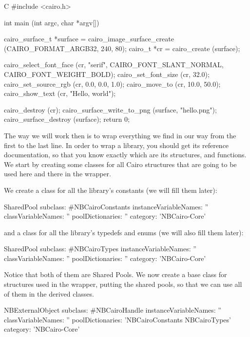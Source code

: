 \documentclass[a4paper,10pt,twoside]{book}
\begin{document}
\begin{code}{C}
#include <cairo.h>

int
main (int argc, char *argv[])
{
        cairo_surface_t *surface =
            cairo_image_surface_create (CAIRO_FORMAT_ARGB32, 240, 80);
        cairo_t *cr =
            cairo_create (surface);

        cairo_select_font_face (cr, "serif", CAIRO_FONT_SLANT_NORMAL, CAIRO_FONT_WEIGHT_BOLD);
        cairo_set_font_size (cr, 32.0);
        cairo_set_source_rgb (cr, 0.0, 0.0, 1.0);
        cairo_move_to (cr, 10.0, 50.0);
        cairo_show_text (cr, "Hello, world");

        cairo_destroy (cr);
        cairo_surface_write_to_png (surface, "hello.png");
        cairo_surface_destroy (surface);
        return 0;
}
\end{code}

The way we will work then is to wrap everything we find in
our way from the first to the last line. In order to wrap a
library, you should get its reference documentation, so that
you know exactly which are its structures, and functions.
We start by creating some classes for all Cairo structures
that are going to be used here and there in the wrapper.

We create a class for all the library's constants (we will
fill them later):

\begin{classdef}{}
SharedPool subclass: #NBCairoConstants
	instanceVariableNames: ''
	classVariableNames: ''
	poolDictionaries: ''
	category: 'NBCairo-Core'
\end{classdef}

and a class for all the library's typedefs and enums (we will
also fill them later):

\begin{classdef}{}
SharedPool subclass: #NBCairoTypes
	instanceVariableNames: ''
	classVariableNames: ''
	poolDictionaries: ''
	category: 'NBCairo-Core'
\end{classdef}

Notice that both of them are Shared Pools. We now create a base
class for structures used in the wrapper, putting the shared pools,
so that we can use all of them in the derived classes. 

\begin{classdef}{}
NBExternalObject subclass: #NBCairoHandle
	instanceVariableNames: ''
	classVariableNames: ''
	poolDictionaries: 'NBCairoConstants NBCairoTypes'
	category: 'NBCairo-Core'
\end{classdef}
\end{document}
